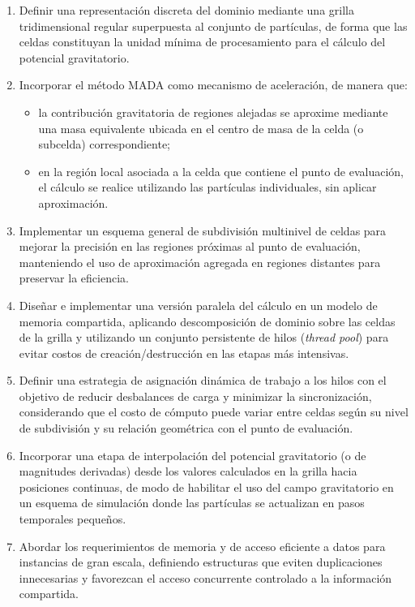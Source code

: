 \documentclass[a4paper,11pt]{book}
\begin{document}
\begin{enumerate}
	\item Definir una representación discreta del dominio mediante una grilla tridimensional regular superpuesta al conjunto de partículas, de forma que las celdas constituyan la unidad mínima de procesamiento para el cálculo del potencial gravitatorio.

	\item Incorporar el método MADA como mecanismo de aceleración, de manera que:
	      \begin{itemize}
		      \item la contribución gravitatoria de regiones alejadas se aproxime mediante una masa equivalente ubicada en el centro de masa de la celda (o subcelda) correspondiente;
		      \item en la región local asociada a la celda que contiene el punto de evaluación, el cálculo se realice utilizando las partículas individuales, sin aplicar aproximación.
	      \end{itemize}

	\item Implementar un esquema general de subdivisión multinivel de celdas para mejorar la precisión en las regiones próximas al punto de evaluación, manteniendo el uso de aproximación agregada en regiones distantes para preservar la eficiencia.

	\item Diseñar e implementar una versión paralela del cálculo en un modelo de memoria compartida, aplicando descomposición de dominio sobre las celdas de la grilla y utilizando un conjunto persistente de hilos (\textit{thread pool}) para evitar costos de creación/destrucción en las etapas más intensivas.

	\item Definir una estrategia de asignación dinámica de trabajo a los hilos con el objetivo de reducir desbalances de carga y minimizar la sincronización, considerando que el costo de cómputo puede variar entre celdas según su nivel de subdivisión y su relación geométrica con el punto de evaluación.

	\item Incorporar una etapa de interpolación del potencial gravitatorio (o de magnitudes derivadas) desde los valores calculados en la grilla hacia posiciones continuas, de modo de habilitar el uso del campo gravitatorio en un esquema de simulación donde las partículas se actualizan en pasos temporales pequeños.

	\item Abordar los requerimientos de memoria y de acceso eficiente a datos para instancias de gran escala, definiendo estructuras que eviten duplicaciones innecesarias y favorezcan el acceso concurrente controlado a la información compartida.


\end{enumerate}
\end{document}

